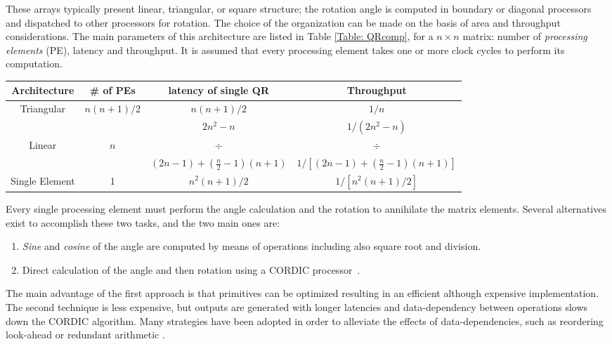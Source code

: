 \documentclass[12pt,onecolumn,draftclsnofoot]{IEEEtran}
\begin{document}
These arrays typically present linear, triangular, or square
structure; the rotation angle is computed in boundary or diagonal
processors and dispatched to other processors for rotation. The
choice of the organization can be made on the basis of area and
throughput considerations. The main parameters of this architecture
are listed in Table \ref{Table: QRcomp}, for a $n \times n$ matrix:
number of {\it processing elements} (PE), latency and throughput. It is
assumed that every processing element takes one or more clock cycles
to perform its computation.

\begin{table*}
\centering
\caption{QR decomposition: different array organization parameters - number of processing elements (PE),
latency and throughput}
\begin{tabular}{|c||c|c|c|} \hline
{\bf Architecture} &{\bf \# of PEs}& {\bf latency of single QR}& {\bf Throughput}\\ \hline \hline
Triangular & $n(n+1)/2$ & $n(n+1)/2$ & $1/n$\\ \hline
 & & $2n^2-n$ & $1/(2n^2-n)$\\
Linear & $n$ & $\div$& $\div$\\
& & $(2n-1)+\left (\frac{n}{2} -1 \right )(n+1)$ & $1/[(2n-1)+\left (\frac{n}{2} -1 \right )(n+1)]$\\ \hline
Single Element & 1 & $n^2(n+1)/2$ & $1/[n^2(n+1)/2]$ \\ \hline\end{tabular}
\label{Table: QRcomp}
\end{table*}


Every single processing element must perform the angle calculation
and the rotation to annihilate the matrix elements. Several
alternatives exist to accomplish these two tasks, and the two main
ones are:

\begin{enumerate}
\item {\it Sine} and {\it cosine} of the angle are computed by means of
operations including also square root and division.
\item Direct calculation of the angle and then rotation using a CORDIC
processor~\cite{CORDIC1}.
\end{enumerate}

The main advantage of the first approach is that primitives can be
optimized resulting in an efficient although expensive
implementation. The second technique is less expensive, but outputs
are generated with longer latencies and data-dependency between
operations slows down the CORDIC algorithm. Many strategies have
been adopted in order to alleviate the effects of data-dependencies, such as
reordering look-ahead\cite{Annih1, Annih2, ReorgCORDIC1} or
redundant arithmetic \cite{RedundantQR}.
\end{document}
